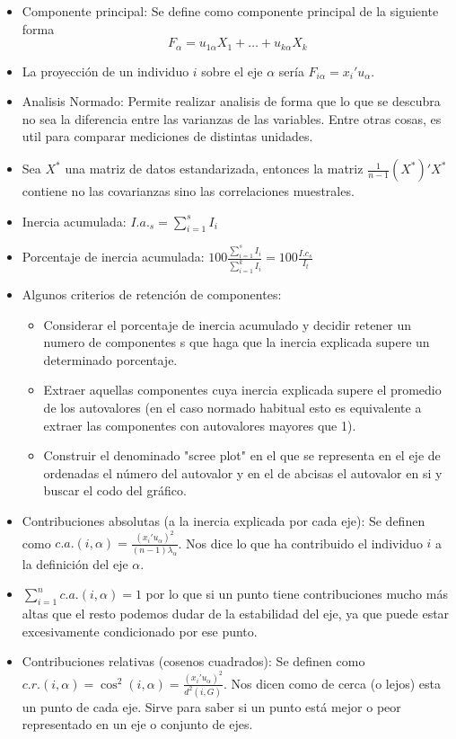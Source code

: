\begin{itemize}
    \item Componente principal: Se define como componente principal de la siguiente forma \[F_\alpha = u_{1\alpha}X_1 + \dots + u_{k\alpha}X_k\]
          \newpage
    \item La proyección de un individuo $i$ sobre el eje $\alpha$ sería $F_{i\alpha} = x_i'u_\alpha$.
    \item Analisis Normado: Permite realizar analisis de forma que lo que se descubra no sea la diferencia entre las varianzas de las variables. Entre otras cosas, es util para comparar mediciones de distintas unidades.
    \item Sea $X^*$ una matriz de datos estandarizada, entonces la matriz $\frac{1}{n-1}(X^*)'X^*$ contiene no las covarianzas sino las correlaciones muestrales.
    \item Inercia acumulada: $I.a._s = \sum_{i=1}^{s}I_i$
    \item Porcentaje de inercia acumulada: $100\frac{\sum_{i=1}^{s}I_i}{\sum_{i=1}^{k}I_i} = 100\frac{I.c_s}{I_t}$
    \item Algunos criterios de retención de componentes:
          \begin{itemize}
              \item Considerar el porcentaje de inercia acumulado y decidir retener un numero de componentes s que haga que la inercia explicada supere un determinado porcentaje.
              \item Extraer aquellas componentes cuya inercia explicada supere el promedio de los autovalores (en el caso normado habitual esto es equivalente a extraer las componentes con autovalores mayores que 1).
              \item Construir el denominado "scree plot" en el que se representa en el eje de ordenadas el número del autovalor y en el de abcisas el autovalor en si y buscar el codo del gráfico.
          \end{itemize}
    \item Contribuciones absolutas (a la inercia explicada por cada eje): Se definen como $c.a.(i,\alpha)=\frac{(x_i'u_\alpha)^2}{(n-1)\lambda_\alpha}$. Nos dice lo que ha contribuido el individuo $i$ a la definición del eje $\alpha$.
    \item $\sum_{i=1}^{n}c.a.(i,\alpha)=1$ por lo que si un punto tiene contribuciones mucho más altas que el resto podemos dudar de la estabilidad del eje, ya que puede estar excesivamente condicionado por ese punto.
    \item Contribuciones relativas (cosenos cuadrados): Se definen como $c.r.(i,\alpha)=\cos^2(i,\alpha)=\frac{(x_i'u_\alpha)^2}{d^2(i,G)}$. Nos dicen como de cerca (o lejos) esta un punto de cada eje. Sirve para saber si un punto está mejor o peor representado en un eje o conjunto de ejes.

\end{itemize}
